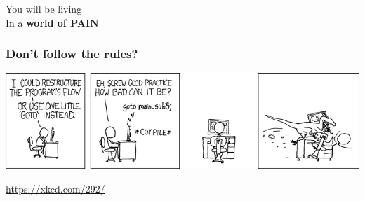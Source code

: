 \documentclass[xcolor={x11names,svgnames},x11names,svgnames]{beamer}
\begin{document}

\begin{frame}[label=world_of_pain]
  \Huge

  
    \begin{center}


  \pause
  \bigskip
  

  \pause
  \bigskip
  
  \scalebox{1.1}You will be living \\
  In a \textbf{world   of \alert{PAIN}}
\end{center}
\end{frame}


\begin{frame}
  \frametitle{Don't follow the rules?}

  \centering
  \includegraphics[width=\textwidth]{goto.png}

  \medskip

  \url{https://xkcd.com/292/}
\end{frame}

\end{document}
